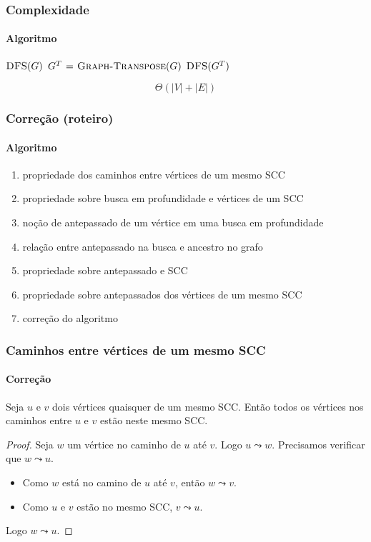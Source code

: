 \documentclass{beamer}
\begin{document}

\begin{frame}
\frametitle{Complexidade}
\framesubtitle{Algoritmo}

\begin{codebox}
\li $\textnormal{\scshape DFS}(G)$ 
\li $G^T \mathrel{\hspace{1pt}=\hspace{1pt}} \textnormal{\scshape Graph-Transpose}(G)$ 
\li $\textnormal{\scshape DFS}(G^T)$ 
\end{codebox}
\pause
$$
\Theta(|V|+|E|)
$$
\end{frame}


\begin{frame}
\frametitle{Correção (roteiro)}
\framesubtitle{Algoritmo}

\begin{enumerate}
\item propriedade dos caminhos entre vértices de um mesmo SCC
\item propriedade sobre busca em profundidade e vértices de um SCC
\item noção de \alert{antepassado} de um vértice em uma busca em profundidade
\item relação entre antepassado na busca e ancestro no grafo
\item propriedade sobre antepassado e SCC
\item propriedade sobre antepassados dos vértices de um mesmo SCC
\item correção do algoritmo
\end{enumerate}
\end{frame}


\begin{frame}
\frametitle{Caminhos entre vértices de um mesmo SCC}
\framesubtitle{Correção}

\begin{lemma}
Seja $u$ e $v$ dois vértices quaisquer de um mesmo SCC. Então todos
os vértices nos caminhos entre $u$ e $v$ estão neste mesmo SCC.
\end{lemma}
\pause
\begin{proof}
Seja $w$ um vértice no caminho de $u$ até $v$. Logo $u \leadsto w$. Precisamos verificar que $w \leadsto u$.
\begin{itemize}
\item Como $w$ está no camino de $u$ até $v$, então $w \leadsto v$.
\item Como $u$ e $v$ estão no mesmo SCC, $v \leadsto u$.
\end{itemize}
Logo $w \leadsto u$.
\end{proof}
\end{frame}
\end{document}
